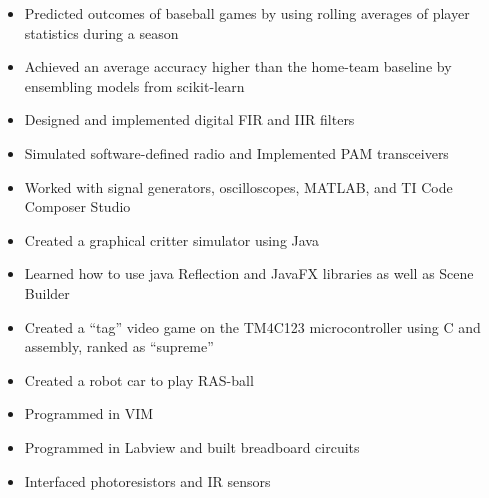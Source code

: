 \documentclass{resume}
\begin{document}
\begin{itemize}
    \item Predicted outcomes of baseball games by using rolling averages of player statistics during a season
    \item Achieved an average accuracy higher than the home-team baseline by ensembling models from scikit-learn
\end{itemize}
\begin{itemize}
    \item Designed and implemented digital FIR and IIR filters
    \item Simulated software-defined radio and Implemented PAM transceivers
    \item Worked with signal generators, oscilloscopes, MATLAB, and TI Code Composer Studio
\end{itemize}
\begin{itemize}
    \item Created a graphical critter simulator using Java
    \item Learned how to use java Reflection and JavaFX libraries as well as Scene Builder
\end{itemize}
\begin{itemize}
    \item Created a “tag” video game on the TM4C123 microcontroller using C and assembly, ranked as “supreme”
\end{itemize}
\begin{itemize}
    \item Created a robot car to play RAS-ball
    \item Programmed in VIM
\end{itemize}
\begin{itemize}
    \item Programmed in Labview and built breadboard circuits
    \item Interfaced photoresistors and IR sensors
\end{itemize}
\end{document}
